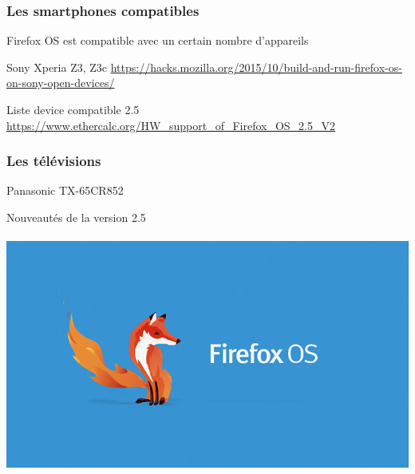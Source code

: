 \documentclass{beamer}
\begin{document}
\begin{frame}
\frametitle{Les smartphones compatibles}
\begin{block}{Firefox OS est compatible avec un certain nombre d'appareils}
\end{block} 
\begin{block}{Sony Xperia Z3, Z3c }
\url{https://hacks.mozilla.org/2015/10/build-and-run-firefox-os-on-sony-open-devices/}\end{block} 
\begin{block}{Liste device compatible 2.5} 
\url{https://www.ethercalc.org/HW_support_of_Firefox_OS_2.5_V2}
\end{block} 
\end{frame}

\begin{frame}
\frametitle{Les télévisions}
\begin{block}{Panasonic TX-65CR852}
\justifying{

}
\end{block} 
\end{frame}
\begin{frame}
\begin{center}
\Huge{Nouveautés de la version 2.5}
\\~\\
\includegraphics[scale=0.3]{./images/firefox-os.jpg}
\end{center}
\end{frame}
\end{document}
